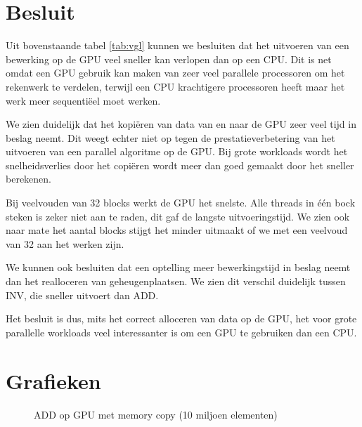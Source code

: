 \documentclass[twoside,a4paper]{article}
\begin{document}
\newpage
\section{Besluit}

Uit bovenstaande tabel \ref{tab:vgl} kunnen we besluiten dat het uitvoeren van een bewerking op de GPU veel sneller kan verlopen dan op een CPU. Dit is net omdat een GPU gebruik kan maken van zeer veel parallele processoren om het rekenwerk te verdelen, terwijl een CPU krachtigere processoren heeft maar het werk meer sequenti\"eel moet werken.

We zien duidelijk dat het kopi\"eren van data van en naar de GPU zeer veel tijd in beslag neemt. Dit weegt echter niet op tegen de prestatieverbetering van het uitvoeren van een parallel algoritme op de GPU. Bij grote workloads wordt het snelheidsverlies door het copi\"eren wordt meer dan goed gemaakt door het sneller berekenen.

Bij veelvouden van 32 blocks werkt de GPU het snelste. Alle threads in \'e\'en bock steken is zeker niet aan te raden, dit gaf de langste uitvoeringstijd. We zien ook naar mate het aantal blocks stijgt het minder uitmaakt of we met een veelvoud van 32 aan het werken zijn.

We kunnen ook besluiten dat een optelling meer bewerkingstijd in beslag neemt dan het realloceren van geheugenplaatsen. We zien dit verschil duidelijk tussen INV, die sneller uitvoert dan ADD.

Het besluit is dus, mits het correct alloceren van data op de GPU, het voor grote parallelle workloads veel interessanter is om een GPU te gebruiken dan een CPU.



\newpage
\appendix
\section{Grafieken}
\label{grafieken}

\begin{figure}[H]
    \centering
    
    \caption{ADD op GPU met memory copy (10 miljoen elementen)}
    \label{fig:ADD_gpu_with_memcopy_10mil_goed}
\end{figure}
\end{document}
